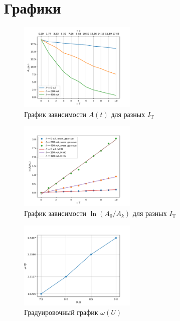 \section{Графики}

\begin{figure}[H]
  \centering
	\includegraphics[width=0.5\textwidth]{figures/amplitude_t.pdf}
	\caption{График зависимости $A(t)$ для разных $I_\text{T}$}
  \label{fig:amplitude_t}
\end{figure}

\begin{figure}[H]
  \centering
	\includegraphics[width=0.5\textwidth]{figures/log_dec.pdf}
	\caption{График зависимости $\ln(A_0 / A_k)$ для разных $I_\text{T}$}
  \label{fig:log_dec}
\end{figure}

\begin{figure}[H]
  \centering
	\includegraphics[width=0.5\textwidth]{figures/omega_u.pdf}
  \caption{Градуировочный график $\omega(U)$}
  \label{fig:omega_u}
\end{figure}

